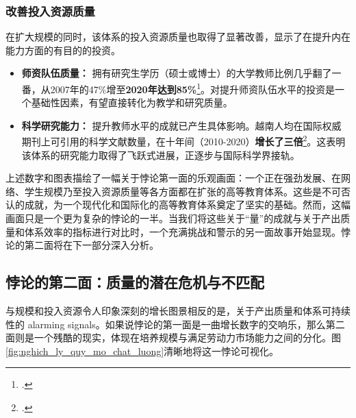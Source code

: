 \subsubsection{改善投入资源质量}
在扩大规模的同时，该体系的投入资源质量也取得了显著改善，显示了在提升内在能力方面的有目的的投资。
\begin{itemize}
    \item \textbf{师资队伍质量：} 拥有研究生学历（硕士或博士）的大学教师比例几乎翻了一番，从2007年的47\%增至\textbf{2020年达到85\%}\footcite{worldbank_p178112}。对提升师资队伍水平的投资是一个基础性因素，有望直接转化为教学和研究质量。
    \item \textbf{科学研究能力：} 提升教师水平的成就已产生具体影响。越南人均在国际权威期刊上可引用的科学文献数量，在十年间（2010-2020）\textbf{增长了三倍}\footcite{worldbank_improvingperformance_2020}。这表明该体系的研究能力取得了飞跃式进展，正逐步与国际科学界接轨。
\end{itemize}

上述数字和图表描绘了一幅关于悖论第一面的乐观画面：一个正在强劲发展、在网络、学生规模乃至投入资源质量等各方面都在扩张的高等教育体系。这些是不可否认的成就，为一个现代化和国际化的高等教育体系奠定了坚实的基础。然而，这幅画面只是一个更为复杂的悖论的一半。当我们将这些关于“量”的成就与关于产出质量和体系效率的指标进行对比时，一个充满挑战和警示的另一面故事开始显现。悖论的第二面将在下一部分深入分析。





\subsection{悖论的第二面：质量的潜在危机与不匹配}
\label{subsec:ve_thu_hai_nghich_ly}

与规模和投入资源令人印象深刻的增长图景相反的是，关于产出质量和体系可持续性的 alarming signals。如果说悖论的第一面是一曲增长数字的交响乐，那么第二面则是一个残酷的现实，体现在培养规模与满足劳动力市场能力之间的分化。图\ref{fig:nghich_ly_quy_mo_chat_luong}清晰地将这一悖论可视化。

